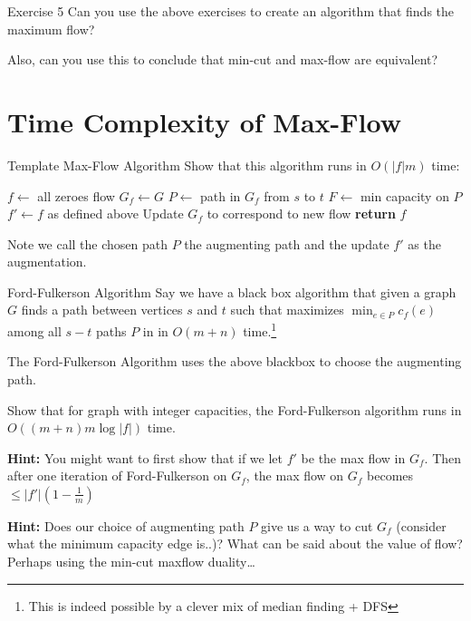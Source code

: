 \documentclass[aspectratio=169]{beamer}
\newcommand{\blankslides}{%
  \begin{frame}[plain]\end{frame}%
}
\begin{document}
\begin{frame}{Exercise 5}
  Can you use the above exercises to create an algorithm that finds the maximum flow?

  \medskip
  Also, can you use this to conclude that min-cut and max-flow are equivalent?
\end{frame}
\blankslides

\section{Time Complexity of Max-Flow}

\begin{frame}{Template Max-Flow Algorithm}
  Show that this algorithm runs in $O(|f|m)$ time:

  \medskip
  \begin{algorithmic}[1]
    \State $f \gets$ all zeroes flow
    \State $G_f \gets G$
      \State $P \gets$ path in $G_f$ from $s$ to $t$
      \State $F \gets$ min capacity on $P$
      \State $f' \gets f$ as defined above
      \State Update $G_f$ to correspond to new flow
    \EndWhile
    \State \textbf{return} $f$
  \end{algorithmic}

  \medskip
  Note we call the chosen path $P$ the augmenting path and the update $f'$ as the augmentation.
\end{frame}
\blankslides

\begin{frame}{Ford-Fulkerson Algorithm}
  \small
  Say we have a black box algorithm that given a graph $G$ finds a path between vertices $s$ and $t$ such that maximizes $\min_{e \in P} c_f(e)$ among all $s-t$ paths $P$ in in $O(m+n)$ time.\footnote{This is indeed possible by a clever mix of median finding + DFS}

  \medskip
  The Ford-Fulkerson Algorithm uses the above blackbox to choose the augmenting path.

  Show that for graph with integer capacities, the Ford-Fulkerson algorithm runs in $O((m+n)m\log|f|)$ time.

  \medskip
  \textbf{Hint:} You might want to first show that if we let $f'$ be the max flow in $G_f$. Then after one iteration of Ford-Fulkerson on $G_f$, the max flow on $G_f$ becomes $\le |f'|\left(1 - \frac{1}{m}\right)$

  \medskip
  \textbf{Hint:} Does our choice of augmenting path $P$ give us a way to cut $G_f$ (consider what the minimum capacity edge is..)? What can be said about the value of flow? Perhaps using the min-cut maxflow duality\ldots
\end{frame}
\blankslides
\end{document}
